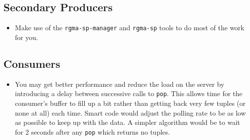 \subsection{Secondary Producers}

\begin{itemize}
\item{Make use of the \texttt{rgma-sp-manager} and \texttt{rgma-sp} tools to do
most of the work for you.}

\end{itemize}

\subsection{Consumers}
\label{sec:adviceConsumers}

\begin{itemize}
    
\item{You may get better performance and reduce the load on the server
  by introducing a delay between successive calls to
  \texttt{pop}. This allows time for the consumer's buffer to fill up
  a bit rather than getting back very few tuples (or none at all) each
  time. Smart code would adjust the polling rate to be as low as
  possible to keep up with the data. A simpler algorithm would be to
  wait for 2 seconds after any \texttt{pop} which returns no tuples.}
\end{itemize}
